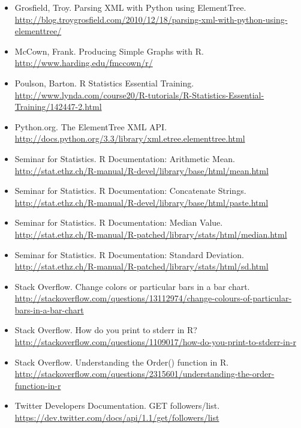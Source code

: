 \documentclass{article}
\begin{document}
\begin{itemize}
\item Grosfield, Troy. Parsing XML with Python using ElementTree. \url{http://blog.troygrosfield.com/2010/12/18/parsing-xml-with-python-using-elementtree/}
\item McCown, Frank. Producing Simple Graphs with R. \url{http://www.harding.edu/fmccown/r/}
\item Poulson, Barton. R Statistics Essential Training. \url{http://www.lynda.com/course20/R-tutorials/R-Statistics-Essential-Training/142447-2.html}
\item Python.org. The ElementTree XML API. \url{http://docs.python.org/3.3/library/xml.etree.elementtree.html}
\item Seminar for Statistics. R Documentation: Arithmetic Mean. \url{http://stat.ethz.ch/R-manual/R-devel/library/base/html/mean.html}
\item Seminar for Statistics. R Documentation: Concatenate Strings. \url{http://stat.ethz.ch/R-manual/R-devel/library/base/html/paste.html}
\item Seminar for Statistics. R Documentation: Median Value. \url{http://stat.ethz.ch/R-manual/R-patched/library/stats/html/median.html}
\item Seminar for Statistics. R Documentation: Standard Deviation. \url{http://stat.ethz.ch/R-manual/R-patched/library/stats/html/sd.html}
\item Stack Overflow. Change colors or particular bars in a bar chart. \url{http://stackoverflow.com/questions/13112974/change-colours-of-particular-bars-in-a-bar-chart}
\item Stack Overflow. How do you print to stderr in R? \url{http://stackoverflow.com/questions/1109017/how-do-you-print-to-stderr-in-r}
\item Stack Overflow. Understanding the Order() function in R. \url{http://stackoverflow.com/questions/2315601/understanding-the-order-function-in-r}
\item Twitter Developers Documentation. GET followers/list. \url{https://dev.twitter.com/docs/api/1.1/get/followers/list}
\end{itemize}
\end{document}
